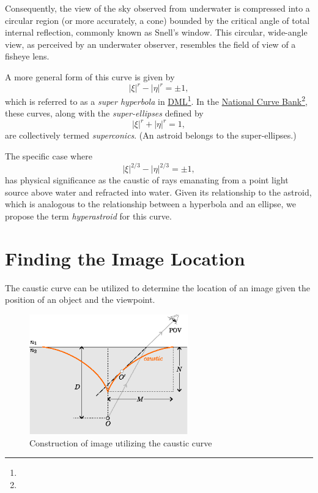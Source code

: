 \documentclass[twocolumn]{article}
\begin{document}
Consequently, the view of the sky observed from underwater is compressed into a circular region (or more accurately, a cone) bounded by the critical angle of total internal reflection, commonly known as Snell's window. This circular, wide-angle view, as perceived by an underwater observer, resembles the field of view of a fisheye lens.

A more general form of this curve is given by 
$$ \left| \xi \right|^{r} - \left| \eta \right|^{r} = \pm1, $$
which is referred to as a \emph{super hyperbola} in \href{http://dynamicmathematicslearning.com/super-ellipse.html}{DML}\footnote{}. In the \href{https://old.nationalcurvebank.org/superconicncb/superconicncb.htm}{National Curve Bank}\footnote{}, these curves, along with the \emph{super-ellipses} defined by
$$ \left| \xi \right|^{r} + \left| \eta \right|^{r} = 1, $$
are collectively termed \emph{superconics}. (An astroid belongs to the super-ellipses.) 

The specific case where 
$$ \left| \xi \right|^{2/3} - \left| \eta \right|^{2/3} = \pm1, $$
has physical significance as the caustic of rays emanating from a point light source above water and refracted into water. Given its relationship to the astroid, which is analogous to the relationship between a hyperbola and an ellipse, we propose the term \emph{hyperastroid} for this curve.

\section{Finding the Image Location}

The caustic curve can be utilized to determine the location of an image given the position of an object and the viewpoint.
%

\begin{figure}[h]
	\centering
	\includegraphics[width=2.7in]{figs/g394.eps}
	\caption{Construction of image utilizing the caustic curve}
	\label{fig:image_caustic}
\end{figure}
\end{document}
